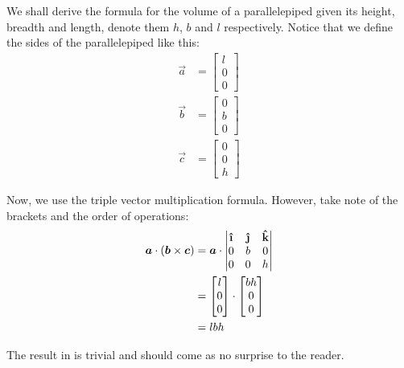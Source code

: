 \begin{example}
  We shall derive the formula for the volume of a parallelepiped given its height, breadth and length, denote them \(h\), \(b\) and \(l\) respectively. Notice that we define the sides of the parallelepiped like this:
  \begin{align*}
    \vec{a} &= \begin{bmatrix}
      l \\
      0 \\
      0
    \end{bmatrix} \\
    \vec{b} &= \begin{bmatrix}
      0 \\
      b \\
      0
    \end{bmatrix} \\
    \vec{c} &= \begin{bmatrix}
      0 \\
      0 \\
      h
    \end{bmatrix}
  \end{align*}


  Now, we use the triple vector multiplication formula. However, take note of the brackets and the order of operations: 
  \begin{align}
    \vec{a} \cdot (\vec{b} \times \vec{c} ) &= \vec{a} \cdot \begin{vmatrix}
      \ihat & \jhat & \khat \\
      0 & b & 0 \\
      0 & 0 & h
    \end{vmatrix} \nonumber \\
    &= \begin{bmatrix}
      l \\
      0 \\
      0
    \end{bmatrix} \cdot \begin{bmatrix}
      bh \\
      0 \\
      0
    \end{bmatrix} \nonumber \\
    &= lbh
    \label{volofpara}
  \end{align}


  The result in  is trivial and should come as no surprise to the reader.
\end{example}


